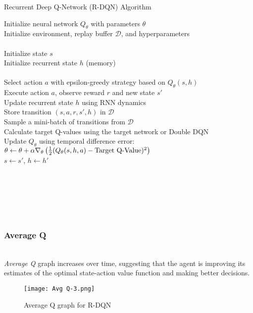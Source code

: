 \documentclass[preprint,12pt]{elsarticle}
\begin{document}
\begin{algorithm}
\caption{Recurrent Deep Q-Network (R-DQN) Algorithm}
\begin{algorithmic}
    \STATE Initialize neural network $Q_\theta$ with parameters $\theta$\\
    \STATE Initialize environment, replay buffer $\mathcal{D}$, and hyperparameters\\
    \\
        \STATE Initialize state $s$\\
        \STATE Initialize recurrent state $h$ (memory)\\
        \\
            \STATE Select action $a$ with epsilon-greedy strategy based on $Q_\theta(s, h)$\\
            \STATE Execute action $a$, observe reward $r$ and new state $s'$\\
            \STATE Update recurrent state $h$ using RNN dynamics\\
            \STATE Store transition $(s, a, r, s', h)$ in $\mathcal{D}$\\
            \STATE Sample a mini-batch of transitions from $\mathcal{D}$\\
            \STATE Calculate target Q-values using the target network or Double DQN\\
            \STATE Update $Q_\theta$ using temporal difference error:\\
            \STATE \quad $\theta \leftarrow \theta + \alpha \nabla_\theta \left(\frac{1}{2}\\(Q_\theta(s, h, a) - \text{Target Q-Value})^2 \right)$\\
            \STATE $s \leftarrow s'$, $h \leftarrow h'$\\
        \ENDFOR\\
    \ENDFOR\\
\end{algorithmic}\\
\end{algorithm}\\
\vspace{1cm}
\subsubsection{Average Q}\\
\textit{Average Q} graph increases over time, suggesting that the agent is improving its estimates of the optimal state-action value function and making better decisions.
\graphicspath{ {./images/} }
\begin{figure}[!htbp]
  \centering
  \texttt{[image: Avg Q-3.png]}
  \caption{Average Q graph for R-DQN}
  \label{fig:avg-q}
\end{figure}
\end{document}
